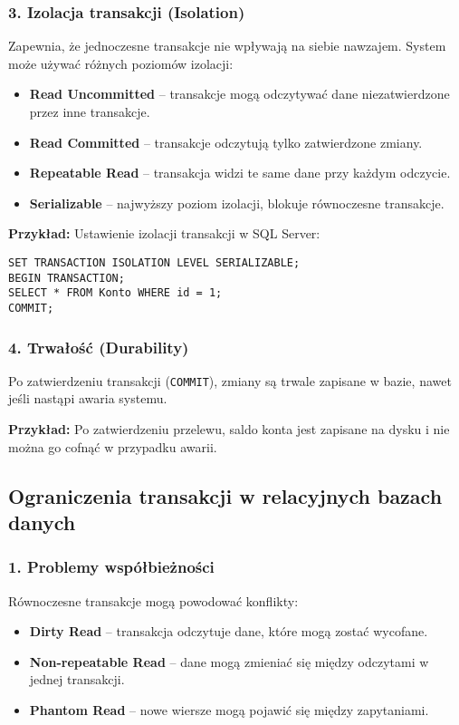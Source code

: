 \subsubsection{3. Izolacja transakcji (Isolation)}
Zapewnia, że jednoczesne transakcje nie wpływają na siebie nawzajem. System może używać różnych poziomów izolacji:
\begin{itemize}
    \item \textbf{Read Uncommitted} – transakcje mogą odczytywać dane niezatwierdzone przez inne transakcje.
    \item \textbf{Read Committed} – transakcje odczytują tylko zatwierdzone zmiany.
    \item \textbf{Repeatable Read} – transakcja widzi te same dane przy każdym odczycie.
    \item \textbf{Serializable} – najwyższy poziom izolacji, blokuje równoczesne transakcje.
\end{itemize}

\textbf{Przykład:}  
Ustawienie izolacji transakcji w SQL Server:
\begin{verbatim}
SET TRANSACTION ISOLATION LEVEL SERIALIZABLE;
BEGIN TRANSACTION;
SELECT * FROM Konto WHERE id = 1;
COMMIT;
\end{verbatim}

\subsubsection{4. Trwałość (Durability)}
Po zatwierdzeniu transakcji (\texttt{COMMIT}), zmiany są trwale zapisane w bazie, nawet jeśli nastąpi awaria systemu.

\textbf{Przykład:}  
Po zatwierdzeniu przelewu, saldo konta jest zapisane na dysku i nie można go cofnąć w przypadku awarii.

\subsection{Ograniczenia transakcji w relacyjnych bazach danych}

\subsubsection{1. Problemy współbieżności}
Równoczesne transakcje mogą powodować konflikty:
\begin{itemize}
    \item \textbf{Dirty Read} – transakcja odczytuje dane, które mogą zostać wycofane.
    \item \textbf{Non-repeatable Read} – dane mogą zmieniać się między odczytami w jednej transakcji.
    \item \textbf{Phantom Read} – nowe wiersze mogą pojawić się między zapytaniami.
\end{itemize}

